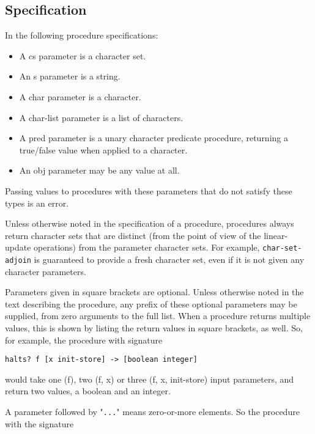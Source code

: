 \subsection{{Specification}}\label{specification}

In the following procedure specifications:

\begin{itemize}
\tightlist
\item
  A cs parameter is a character set.
\item
  An s parameter is a string.
\item
  A char parameter is a character.
\item
  A char-list parameter is a list of characters.
\item
  A pred parameter is a unary character predicate procedure, returning a
  true/false value when applied to a character.
\item
  An obj parameter may be any value at all.
\end{itemize}

Passing values to procedures with these parameters that do not satisfy
these types is an error.

Unless otherwise noted in the specification of a procedure, procedures
always return character sets that are distinct (from the point of view
of the linear-update operations) from the parameter character sets. For
example, \texttt{char-set-adjoin} is guaranteed to provide a fresh
character set, even if it is not given any character parameters.

Parameters given in square brackets are optional. Unless otherwise noted
in the text describing the procedure, any prefix of these optional
parameters may be supplied, from zero arguments to the full list. When a
procedure returns multiple values, this is shown by listing the return
values in square brackets, as well. So, for example, the procedure with
signature

\begin{verbatim}
halts? f [x init-store] -> [boolean integer]
\end{verbatim}

would take one (f), two (f, x) or three (f, x, init-store) input
parameters, and return two values, a boolean and an integer.


A parameter followed by "\texttt{...}" means zero-or-more elements. So
the procedure with the signature

